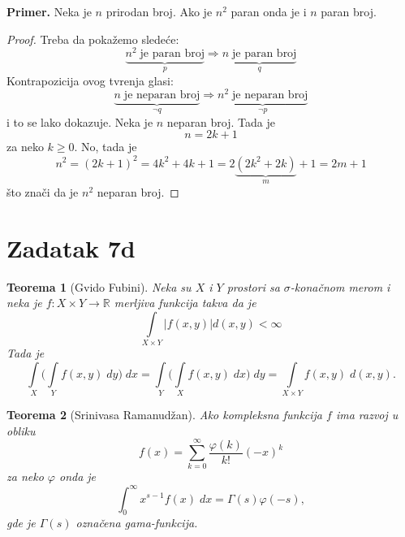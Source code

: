 \documentclass[10pt,a4paper]{article}
\newtheorem*{theorem*}{Teorema}
\begin{document}
\vspace*{6px}
\noindent
\textbf{Primer.} \quad Neka je $n$ prirodan broj. Ako je $n^2$ paran onda je i $n$ paran broj.
\begin{proof}
    Treba da poka\v{z}emo slede\'ce:
    \[
        \underbrace{n^2 \; \text{je paran broj}}_p \Rightarrow \underbrace{n \; \text{je paran broj}}_q
    \]
    Kontrapozicija ovog tvr\dj enja glasi:
    \[
        \underbrace{n \; \text{je neparan broj}}_{\neg q} \Rightarrow \underbrace{n^2 \; \text{je neparan broj}}_{\neg p}
    \]
    i to se lako dokazuje. Neka je $n$ neparan broj. Tada je
    \[
        n = 2k + 1
    \]
    za neko $k \geq 0$. No, tada je
    \[
        n^2 = (2k + 1)^2 = 4k^2 + 4k + 1 = 2 \underbrace{(2k^2 + 2k)}_m + 1 = 2m + 1
    \]
    \v{s}to zna\v{c}i da je $n^2$ neparan broj.
\end{proof}

\section{Zadatak 7d}

\begin{theorem*}[Gvido Fubini]
    \normalfont
    Neka su $X$ i $Y$ prostori sa $\sigma$-kona\v{c}nom merom i neka je 
    $f: X \times Y \rightarrow \mathbb{R}$ merljiva funkcija takva da je 
    \[
        \int\limits_{X \times Y} |f(x, y)| d(x, y) < \infty
    \]
    Tada je
    \[
        \int\limits_X \Biggl(\int\limits_Y f(x, y)\; dy \Biggr) \; dx = 
        \int\limits_Y \Biggl(\int\limits_X f(x, y)\; dx \Biggr) \; dy =
        \int\limits_{X \times Y} f(x, y)\; d(x, y).
    \]
\end{theorem*}

\pagebreak

\begin{theorem*}[Srinivasa Ramanud\v{z}an]
    \normalfont
    Ako kompleksna funkcija $f$ ima razvoj u obliku
    \[
        f(x) = \sum_{k=0}^\infty \frac{\varphi (k)}{k!} (-x)^k
    \]
    za neko $\varphi$ onda je
    \[
        \int_0^\infty x^{s-1} f(x)\; dx = \Gamma (s) \varphi (-s),
    \]
    gde je $\Gamma(s)$ ozna\v{c}ena gama-funkcija.
\end{theorem*}
\end{document}

